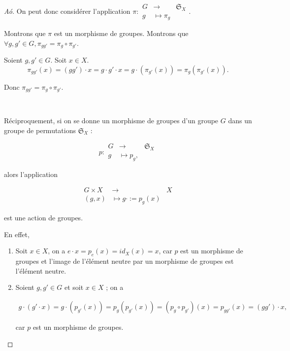 \documentclass[french]{book}
\theoremstyle{definition}
\begin{document}
\begin{proof}[A\textpi\'o\textdelta\textepsilon\textiota\textxi\textiota]
  On peut donc considérer l'application $\pi:
    \begin{array}{rcl}
    G & \longrightarrow & \mathfrak{S}_{X}  \\
    g & \longmapsto \pi_g
    \end{array}$.

  Montrons que $\pi$ est un morphisme de groupes. Montrons que $\forall g, g' \in G, \pi _{g g'} = \pi_g \circ \pi _{g'}$.

  Soient $g, g' \in G$. Soit $x \in X$. $$\pi _{ gg'}(x) = (g g') \cdot x = g \cdot g' \cdot x = g \cdot (\pi _{ g'} (x)) = \pi_g (\pi _{ g'}(x)).$$

  Donc $\pi _{ gg'} = \pi_g \circ \pi _{ g'}$.

  \

  Réciproquement, si on se donne un morphisme de groupes d'un groupe $G$ dans un groupe de permutations $\mathfrak{S}_{X} $ :

  \[
  p:
    \begin{array}{rcl}
    G & \longrightarrow & \mathfrak{S}_{X}  \\
    g & \longmapsto p_g,
    \end{array}
  \]

  alors l'application

  \[
    \begin{array}{rcl}
    G \times X & \longrightarrow & X \\
    (g,x) & \longmapsto g \cdot := p_g(x)
    \end{array}
  \]

  est une action de groupes.

  En effet,

  \begin{enumerate}
    \item Soit $x \in X$, on a $e \cdot x = p_e(x) = id_X(x) = x$, car $p$ est un morphisme de groupes et l'image de l'élément neutre par un morphisme de groupes est l'élément neutre.
    \item Soient $g, g' \in G$ et soit $x \in X$ ; on a

    \begin{gather*}
      g \cdot (g' \cdot x) = g \cdot (p _{g'}(x)) = p_g(p _{g'}(x)) = (p_g \circ p _{g'})(x) = p _{gg'}(x) = (gg') \cdot x,
    \end{gather*}

    car $p$ est un morphisme de groupes.
  \end{enumerate}
\end{proof}
\end{document}

